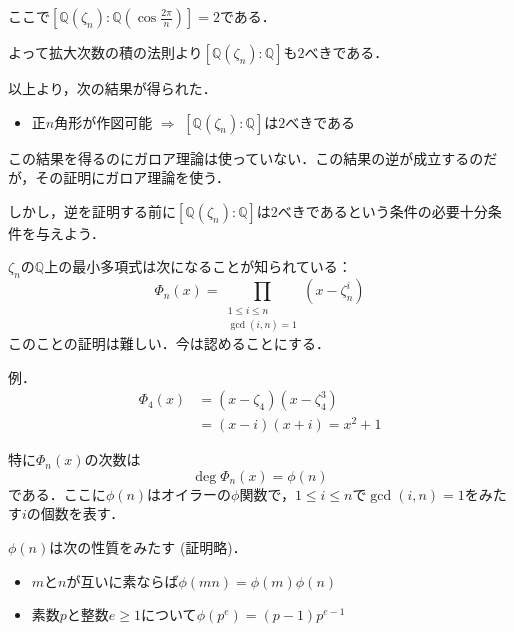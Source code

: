 \documentclass[dvipdfmx,17pt]{beamer}
\theoremstyle{plain}
\newcommand{\Q}{\mathbb{Q}}
\begin{document}
\begin{frame}
ここで$[\Q(\zeta_n) : \Q(\cos \frac{2 \pi}{n})] = 2$である．

よって拡大次数の積の法則より$[\Q(\zeta_n) : \Q]$も$2$べきである．
\end{frame}

\begin{frame}
以上より，次の結果が得られた．

\begin{itemize}
\item 正$n$角形が作図可能 $\Rightarrow$ $[\Q(\zeta_n) : \Q]$は$2$べきである
\end{itemize}

この結果を得るのにガロア理論は使っていない．この結果の逆が成立するのだが，その証明にガロア理論を使う．

しかし，逆を証明する前に$[\Q(\zeta_n) : \Q]$は$2$べきであるという条件の必要十分条件を与えよう．
\end{frame}

\begin{frame}
$\zeta_n$の$\Q$上の最小多項式は次になることが知られている：
\[ \Phi_n(x) = \prod_{\substack{1 \le i \le n \\ \gcd(i, n) = 1}} (x - \zeta_n^i) \]
このことの証明は難しい．今は認めることにする．
\end{frame}

\begin{frame}
例．
\begin{align*}
\Phi_4(x) &= (x - \zeta_4)(x - \zeta_4^3) \\
&= (x - i)(x + i) = x^2 + 1
\end{align*}
\end{frame}

\begin{frame}
特に$\Phi_n(x)$の次数は
\[ \deg \Phi_n(x) = \phi(n) \]
である．ここに$\phi(n)$はオイラーの$\phi$関数で，$1 \le i \le n$で$\gcd(i, n) = 1$をみたす$i$の個数を表す．
\end{frame}

\begin{frame}
$\phi(n)$は次の性質をみたす (証明略)．
\begin{itemize}
\item $m$と$n$が互いに素ならば$\phi(mn) = \phi(m)\phi(n)$
\item 素数$p$と整数$e \ge 1$について$\phi(p^e) = (p-1)p^{e-1}$
\end{itemize}
\end{frame}
\end{document}

